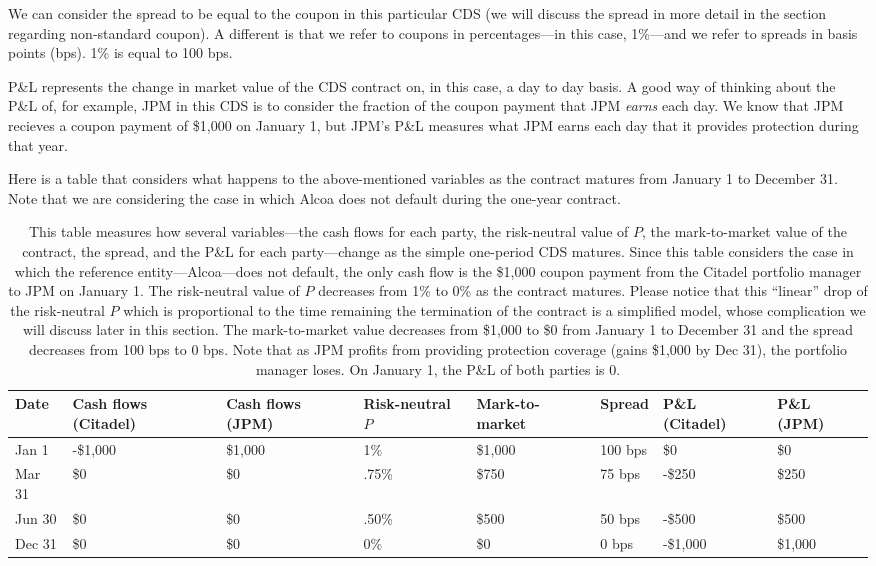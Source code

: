 \documentclass{jss}
\begin{document}
We can consider the spread to be equal to the coupon in this particular CDS (we will discuss the spread in more detail in the section regarding non-standard coupon). A different is that we refer to coupons in percentages---in this case, 1\%---and we refer to spreads in basis points (bps). 1\% is equal to 100 bps.

P\&L represents the change in market value of the CDS contract on, in this case, a day to day basis. A good way of thinking about the P\&L of, for example, JPM in this CDS is to consider the fraction of the coupon payment that JPM \emph{earns} each day. We know that JPM recieves a coupon payment of \$1,000 on January 1, but JPM's P\&L measures what JPM earns each day that it provides protection during that year.

Here is a table that considers what happens to the above-mentioned variables as the contract matures from January 1 to December 31. Note that we are considering the case in which Alcoa does not default during the one-year contract.

\begin{table}[H]
\centering
{\footnotesize
\begin{tabular}{llllllll}
  \hline
Date & Cash flows (Citadel) & Cash flows (JPM) & Risk-neutral $P$ & Mark-to-market & Spread & P\&L (Citadel) & P\&L (JPM) \\ 
  \hline
  Jan 1 & -\$1,000 & \$1,000 & 1\% & \$1,000 & 100 bps & \$0 & \$0 \\ 
  Mar 31 & \$0 & \$0 & .75\% & \$750 & 75 bps & -\$250 & \$250 \\ 
  Jun 30 & \$0 & \$0 & .50\% & \$500 & 50 bps & -\$500 & \$500 \\ 
  Dec 31 & \$0 & \$0 & 0\% & \$0 & 0 bps & -\$1,000 & \$1,000 \\
   \hline
\end{tabular}
}

\caption{This table measures how several variables---the cash flows for each party, the risk-neutral value of $P$, the mark-to-market value of the contract, the spread, and the P\&L for each party---change as the simple one-period CDS matures. Since this table considers the case in which the reference entity---Alcoa---does not default, the only cash flow is the \$1,000 coupon payment from the Citadel portfolio manager to JPM on January 1. The risk-neutral value of $P$ decreases from 1\% to 0\% as the contract matures. Please notice that this ``linear'' drop of the risk-neutral $P$ which is proportional to the time remaining the termination of the contract is a simplified model, whose complication we will discuss later in this section. The mark-to-market value decreases from \$1,000 to \$0 from January 1 to December 31 and the spread decreases from 100 bps to 0 bps. Note that as JPM profits from providing protection coverage (gains \$1,000 by Dec 31), the portfolio manager loses. On January 1, the P\&L of both parties is 0.} 
\label{table.1}
\end{table}
\end{document}
